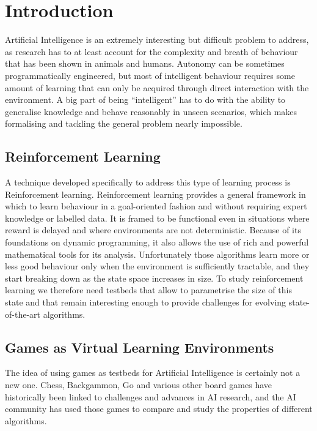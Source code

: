 
\chapter{Introduction}

Artificial Intelligence is an extremely interesting but difficult problem to
address, as research has to at least account for the complexity and breath of
behaviour that has been shown in animals and humans. Autonomy can be sometimes
programmatically engineered, but most of intelligent behaviour requires some
amount of learning that can only be acquired through direct interaction with the
environment. A big part of being ``intelligent'' has to do with the ability
to generalise knowledge and behave reasonably in unseen scenarios, which makes
formalising and tackling the general problem nearly impossible.

\section{Reinforcement Learning}

A technique developed specifically to address this type of learning process is
Reinforcement learning. Reinforcement learning provides a general framework in
which to learn behaviour in a goal-oriented fashion and without requiring expert
knowledge or labelled data. It is framed to be functional even in situations
where reward is delayed and where environments are not deterministic. Because of
its foundations on dynamic programming, it also allows the use of rich and
powerful mathematical tools for its analysis. Unfortunately those algorithms
learn more or less good behaviour only when the environment is sufficiently
tractable, and they start breaking down as the state space increases in size. To
study reinforcement learning we therefore need testbeds that allow to
parametrise the size of this state and that remain interesting enough to provide
challenges for evolving state-of-the-art algorithms.

\section{Games as Virtual Learning Environments}

The idea of using games as testbeds for Artificial Intelligence is certainly not
a new one. Chess, Backgammon, Go and various other board games have historically
been linked to challenges and advances in AI research, and the AI community has
used those games to compare and study the properties of different algorithms.

